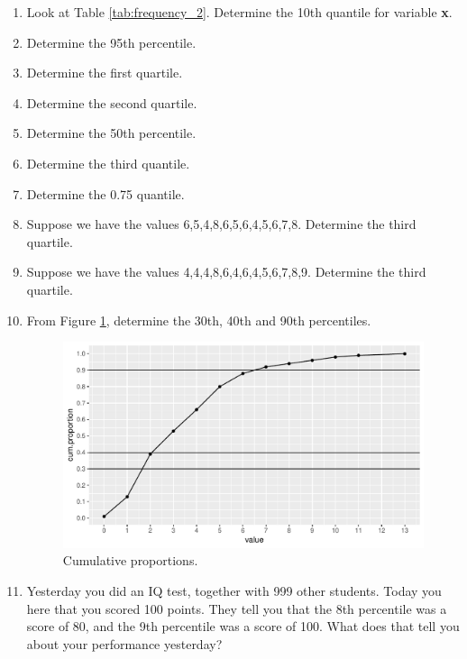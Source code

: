\documentclass[]{report}\usepackage[]{graphicx}\usepackage[]{color}
\makeatletter
\def\maxwidth{ %
  \ifdim\Gin@nat@width>\linewidth
    \linewidth
  \else
    \Gin@nat@width
  \fi
}
\makeatother
\begin{document}
\begin{enumerate}
\item Look at Table \ref{tab:frequency_2}. Determine the 10th quantile for variable \textbf{x}.

\item Determine the 95th percentile.

\item Determine the first quartile.

\item Determine the second quartile.

\item Determine the 50th percentile.

\item Determine the third quantile.

\item Determine the 0.75 quantile.

\item Suppose we have the values {6,5,4,8,6,5,6,4,5,6,7,8}. Determine the third quartile.

\item Suppose we have the values {4,4,4,8,6,4,6,4,5,6,7,8,9}. Determine the third quartile.

\item From Figure \ref{fig:quartile_3}, determine the 30th, 40th and 90th percentiles.

\begin{figure}

{\centering \includegraphics[width=\maxwidth]{figure/quartile_3-1} 

}

\caption[Cumulative proportions]{Cumulative proportions.}\label{fig:quartile_3}
\end{figure}



\item Yesterday you did an IQ test, together with 999 other students. Today you here that you scored 100 points. They tell you that the 8th percentile was a score of 80, and the 9th percentile was a score of 100. What does that tell you about your performance yesterday?


\end{enumerate}
\end{document}
